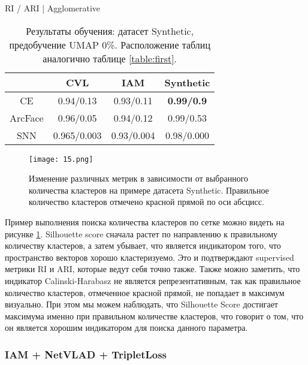 \begin{table}[ht]
{        \hfill
        \begin{subtable}{0.4\linewidth}
            \centering
            \caption{RI / ARI | Agglomerative}
            \begin{tabular}{|c|c|c|c|}
            \hline
                & CVL & IAM & Synthetic \\
            \hline
            CE & 0.94/0.13 & 0.93/0.11 & \textbf{0.99/0.9} \\
            ArcFace & 0.96/0.05 & 0.94/0.12 & 0.99/0.53 \\
            SNN & 0.965/0.003 & 0.93/0.004 & 0.98/0.000 \\
            \hline
            \end{tabular}
        \end{subtable}
    }
    
    \caption{Результаты обучения: датасет Synthetic, предобучение UMAP 0\%. Расположение таблиц аналогично таблице \ref{table:first}.}

    \label{table:second}
\end{table}

\begin{figure}[htbp]
    \centering
    \texttt{[image: 15.png]}
    \captionsetup{width=0.9\textwidth}
    \caption{Изменение различных метрик в зависимости от выбранного количества кластеров на примере датасета Synthetic. Правильное количество кластеров отмечено красной прямой по оси абсцисс.}
    \label{fig:synthetic_plots}
\end{figure}

\clearpage

Пример выполнения поиска количества кластеров по сетке можно видеть на рисунке \ref{fig:synthetic_plots}. Silhouette score сначала растет по направлению к правильному количеству кластеров, а затем убывает, что является индикатором того, что пространство векторов хорошо кластеризуемо. Это и подтверждают supervised метрики RI и ARI, которые ведут себя точно также. Также можно заметить, что индикатор Calinski-Harabasz не является репрезентативным, так как правильное количество кластеров, отмеченное красной прямой, не попадает в максимум визуально. При этом мы можем наблюдать, что Silhouette Score достигает максимума именно при правильном количестве кластеров, что говорит о том, что он является хорошим индикатором для поиска данного параметра. 


\subsubsection{IAM + NetVLAD + TripletLoss}

